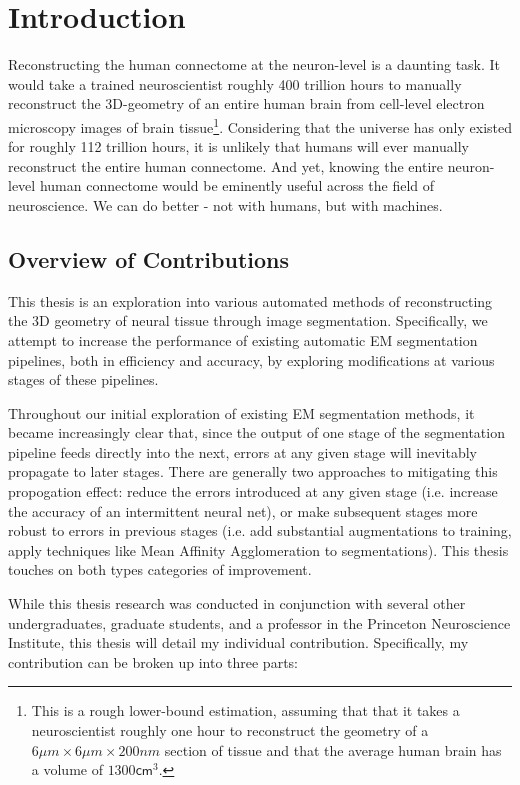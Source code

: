 \chapter{Introduction}

Reconstructing the human connectome at the neuron-level is a daunting task. It would take a trained neuroscientist roughly 400 trillion hours to manually reconstruct the 3D-geometry of an entire human brain from cell-level electron microscopy images of brain tissue\footnote{This is a rough lower-bound estimation, assuming that that it takes a neuroscientist roughly one hour to reconstruct the geometry of a $6\mu m \times 6\mu m \times 200nm $ section of tissue and that the average human brain has a volume of $1300\mathsf{cm}^{3}$.}. Considering that the universe has only existed for roughly 112 trillion hours, it is unlikely that humans will ever manually reconstruct the entire human connectome. And yet, knowing the entire neuron-level human connectome would be eminently useful across the field of neuroscience. We can do better - not with humans, but with machines.


\section{Overview of Contributions}

This thesis is an exploration into various automated methods of reconstructing the 3D geometry of neural tissue through image segmentation. Specifically, we attempt to increase the performance of existing automatic EM segmentation pipelines, both in efficiency and accuracy, by exploring modifications at various stages of these pipelines. 

Throughout our initial exploration of existing EM segmentation methods, it became increasingly clear that, since the output of one stage of the segmentation pipeline feeds directly into the next, errors at any given stage will inevitably propagate to later stages. There are generally two approaches to mitigating this propogation effect: reduce the errors introduced at any given stage (i.e. increase the accuracy of an intermittent neural net), or make subsequent stages more robust to errors in previous stages (i.e. add substantial augmentations to training, apply techniques like Mean Affinity Agglomeration to segmentations). This thesis touches on both types categories of improvement.

While this thesis research was conducted in conjunction with several other undergraduates, graduate students, and a professor in the Princeton Neuroscience Institute, this thesis will detail my individual contribution. Specifically, my contribution can be broken up into three parts:

